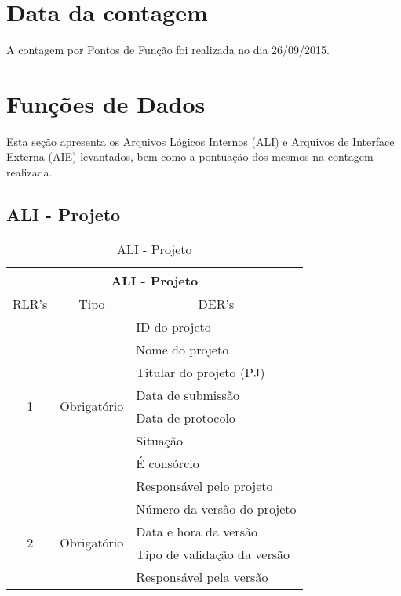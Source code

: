 \section{Data da contagem}

  A contagem por Pontos de Função foi realizada no dia 26/09/2015.

\section{Funções de Dados}

Esta seção apresenta os Arquivos Lógicos Internos (ALI) e Arquivos de Interface Externa (AIE) levantados, bem como a 
pontuação dos mesmos na contagem realizada.

  \subsection{ALI - Projeto}
  
      \begin{table}[!h]
      \centering
      \caption{ALI - Projeto}
      \label{ali_projeto}
      \begin{tabular}{|c|c|l|}
      \hline
      \multicolumn{3}{|c|}{\textbf{ALI - Projeto}}                                                      \\ \hline
      \multicolumn{1}{|l|}{RLR's} & Tipo                         & \multicolumn{1}{c|}{DER's}  \\ \hline
      \multirow{8}{*}{1}          & \multirow{8}{*}{Obrigatório} & ID do projeto               \\ \cline{3-3} 
				  &                              & Nome do projeto             \\ \cline{3-3} 
				  &                              & Titular do projeto (PJ)     \\ \cline{3-3} 
				  &                              & Data de submissão           \\ \cline{3-3} 
				  &                              & Data de protocolo           \\ \cline{3-3} 
				  &                              & Situação                    \\ \cline{3-3} 
				  &                              & É consórcio                 \\ \cline{3-3} 
				  &                              & Responsável pelo projeto    \\ \hline
      \multirow{4}{*}{2}        & \multirow{4}{*}{Obrigatório} & Número da versão do projeto \\ \cline{3-3} 
				  &                              & Data e hora da versão       \\ \cline{3-3} 
				  &                              & Tipo de validação da versão \\ \cline{3-3} 
				  &                              & Responsável pela versão     \\ \hline
      \end{tabular}
      \end{table}

